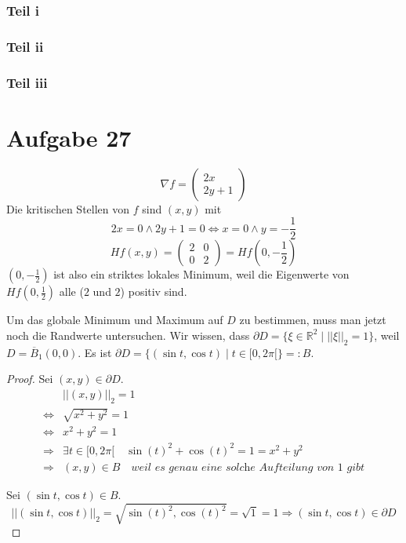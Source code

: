 \documentclass[10pt,a4paper]{article}
\begin{document}
\subsubsection*{Teil i}

\subsubsection*{Teil ii}

\subsubsection*{Teil iii}

\section*{Aufgabe 27}

\begin{equation}
\nabla f = \begin{pmatrix}
2x\\
2y + 1
\end{pmatrix}
\end{equation}
Die kritischen Stellen von $f$ sind $(x, y)$ mit
\begin{equation}
2x = 0 \land 2y + 1 = 0 \Leftrightarrow x = 0 \land y = -\frac{1}{2}
\end{equation}
\begin{equation}
Hf(x, y) = \begin{pmatrix}
2 & 0\\
0 & 2
\end{pmatrix} = Hf(0, -\frac{1}{2})
\end{equation}
$(0, -\frac{1}{2})$ ist also ein striktes lokales Minimum, weil die Eigenwerte von $Hf(0, \frac{1}{2})$ alle ($2$ und $2$) positiv sind.

Um das globale Minimum und Maximum auf $D$ zu bestimmen, muss man jetzt noch die Randwerte untersuchen.
Wir wissen, dass $\partial D = \{ \xi \in \mathbb{R}^{2} \mid ||\xi||_{2} = 1 \}$, weil $D = \overline{B}_{1}(0, 0)$.
Es ist $\partial D = \{ (\sin t, \cos t) \mid t \in [0, 2\pi[ \} =: B$.

\begin{proof}
Sei $(x, y) \in \partial D$.
\begin{align*}
& ||(x, y)||_{2} = 1\\
\Leftrightarrow & \sqrt{x^{2} + y^{2}} = 1\\
\Leftrightarrow & x^{2} + y^{2} = 1\\
\Rightarrow & \exists t \in [0, 2\pi[ \quad \sin(t)^{2} + \cos(t)^{2} = 1 = x^{2} + y^{2}\\
\Rightarrow & (x, y) \in B \quad \textit{weil es genau eine solche Aufteilung von $1$ gibt}
\end{align*}

Sei $(\sin t, \cos t) \in B$.
\begin{equation}
||(\sin t, \cos t)||_{2} = \sqrt{\sin(t)^{2}, \cos(t)^{2}} = \sqrt{1} = 1 \Rightarrow (\sin t, \cos t) \in \partial D
\end{equation}
\end{proof}
\end{document}
